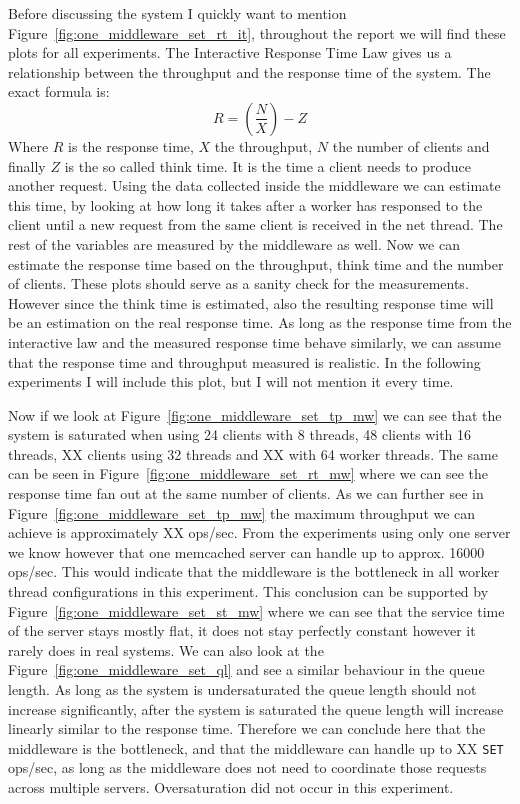 \documentclass[11pt,a4paper]{article}
\begin{document}
%
Before discussing the system I quickly want to mention Figure~\ref{fig:one_middleware_set_rt_it}, throughout the report we will find these plots for all experiments.
%
The Interactive Response Time Law gives us a relationship between the throughput and the response time of the system. The exact formula is:
%
\[
R = \left(\frac{N}{X}\right) - Z
\]
%
Where $R$ is the response time, $X$ the throughput, $N$ the number of clients and finally $Z$ is the so called think time.
%
It is the time a client needs to produce another request.
%
Using the data collected inside the middleware we can estimate this time, by looking at how long it takes after a worker has responsed to the client until a new request from the same client is received in the net thread.
%
The rest of the variables are measured by the middleware as well.
%
Now we can estimate the response time based on the throughput, think time and the number of clients.
%
These plots should serve as a sanity check for the measurements.
%
However since the think time is estimated, also the resulting response time will be an estimation on the real response time.
%
As long as the response time from the interactive law and the measured response time behave similarly, we can assume that the response time and throughput measured is realistic.
%
In the following experiments I will include this plot, but I will not mention it every time.
%
\par
%
Now if we look at Figure~\ref{fig:one_middleware_set_tp_mw} we can see that the system is saturated when using 24 clients with 8 threads, 48 clients with 16 threads, XX clients using 32 threads and XX with 64 worker threads.
%
The same can be seen in Figure~\ref{fig:one_middleware_set_rt_mw} where we can see the response time fan out at the same number of clients.
%
As we can further see in Figure~\ref{fig:one_middleware_set_tp_mw} the maximum throughput we can achieve is approximately XX ops/sec.
%
From the experiments using only one server we know however that one memcached server can handle up to approx. 16000 ops/sec.
%
This would indicate that the middleware is the bottleneck in all worker thread configurations in this experiment.
%
This conclusion can be supported by Figure~\ref{fig:one_middleware_set_st_mw} where we can see that the service time of the server stays mostly flat, it does not stay perfectly constant however it rarely does in real systems.
%
We can also look at the Figure~\ref{fig:one_middleware_set_ql} and see a similar behaviour in the queue length.
%
As long as the system is undersaturated the queue length should not increase significantly, after the system is saturated the queue length will increase linearly similar to the response time.
%
Therefore we can conclude here that the middleware is the bottleneck, and that the middleware can handle up to XX \texttt{SET} ops/sec, as long as the middleware does not need to coordinate those requests across multiple servers.
%
Oversaturation did not occur in this experiment.
%
\end{document}
